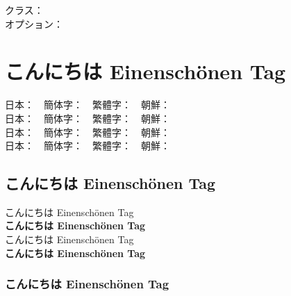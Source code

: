\documentclass[a4paper,titlepage,draft\@landscape@]{\class}
\newif\ifdeluxemode\deluxemodefalse
\begin{document}
\parindent0mm
クラス：\texttt{\class}\\
オプション：\texttt{\option}

\section{   こんにちは Einenschönen Tag}

日本：　簡体字：　繁體字：　朝鮮：\\
日本：　簡体字：　繁體字：　朝鮮：\\
日本：　簡体字：　繁體字：　朝鮮：\\
日本：　簡体字：　繁體字：　朝鮮：

\subsection{   こんにちは Einenschönen Tag}

\ifdeluxemode
{\mcfamily\ltseries
\UTFC{4F60}\UTFC{597D} \UTFT{60A8}\UTFT{597D} \UTFK{C548}\UTFK{B155} %
こんにちは Einenschönen Tag\\
}%
\fi%
{\mcfamily
{}   %
こんにちは Einenschönen Tag\\
}%
{\mcfamily\bfseries
{}   %
こんにちは Einenschönen Tag\\
}%
{\gtfamily
{}   %
こんにちは Einenschönen Tag\\
}%
{\gtfamily\bfseries
{}   %
こんにちは Einenschönen Tag\\
}%
\ifdeluxemode
{\gtfamily\ebseries
\UTFC{4F60}\UTFC{597D} \UTFT{60A8}\UTFT{597D} \UTFK{C548}\UTFK{B155} %
こんにちは Einenschönen Tag\\
}%
{\mgfamily
\UTFC{4F60}\UTFC{597D} \UTFT{60A8}\UTFT{597D} \UTFK{C548}\UTFK{B155} %
こんにちは Einenschönen Tag\\
}%
\fi%

\subsubsection{   こんにちは Einenschönen Tag}
\end{document}

